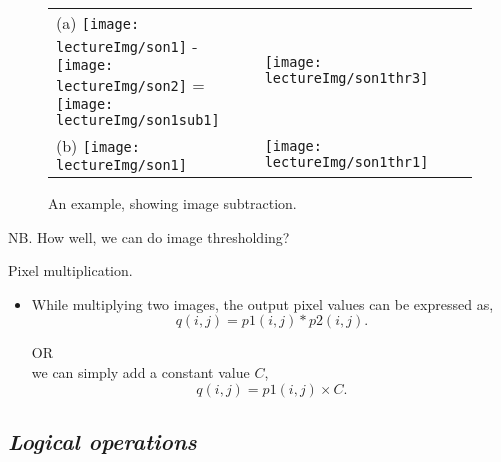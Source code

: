 \documentclass{response}
\begin{document}
{\begin{figure}[hpb]
\centering
\renewcommand{\tabcolsep}{0.3em}
\begin{tabular}{llll}
(a) \texttt{[image: lectureImg/son1]} - 
\texttt{[image: lectureImg/son2]} =
\texttt{[image: lectureImg/son1sub1]} &
\texttt{[image: lectureImg/son1thr3]} \\

(b) \texttt{[image: lectureImg/son1]} &
\texttt{[image: lectureImg/son1thr1]} 
\end{tabular}
\caption{An example, showing image subtraction.}
\end{figure}


NB. How well, we can do image thresholding?




\newpage
\bigskip


{\huge Pixel multiplication.}

\begin{itemize}\setlength\itemsep{-0.5em}
\item While multiplying two images, the output pixel values can be expressed as, $$q(i,j) = p1(i,j) * p2(i,j).$$

OR\\
we can simply add a constant value $C$, $$q(i,j) = p1(i,j) \times C.$$
\end{itemize}


}



\newpage

\subsection*{\Huge\em Logical operations}
\bigskip
\end{document}

